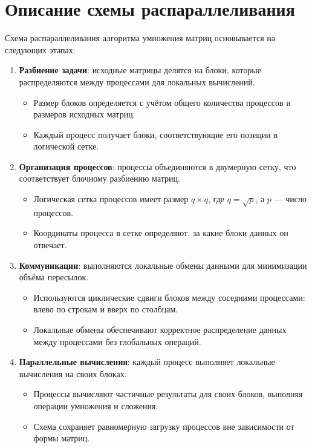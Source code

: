 \documentclass[12pt]{article}
\begin{document}
\section{Описание схемы распараллеливания}
\hspace*{1.25em}Схема распараллеливания алгоритма умножения матриц основывается на следующих этапах:
\begin{enumerate}
    \item \textbf{Разбиение задачи}: исходные матрицы делятся на блоки, которые распределяются между процессами для локальных вычислений.
    \begin{itemize}
        \item Размер блоков определяется с учётом общего количества процессов и размеров исходных матриц.
        \item Каждый процесс получает блоки, соответствующие его позиции в логической сетке.
    \end{itemize}
    
    \item \textbf{Организация процессов}: процессы объединяются в двумерную сетку, что соответствует блочному разбиению матриц.
    \begin{itemize}
        \item Логическая сетка процессов имеет размер $q \times q$, где $q = \sqrt{p}$, а $p$ — число процессов.
        \item Координаты процесса в сетке определяют, за какие блоки данных он отвечает.
    \end{itemize}
    
    \item \textbf{Коммуникации}: выполняются локальные обмены данными для минимизации объёма пересылок.
    \begin{itemize}
        \item Используются циклические сдвиги блоков между соседними процессами: влево по строкам и вверх по столбцам.
        \item Локальные обмены обеспечивают корректное распределение данных между процессами без глобальных операций.
    \end{itemize}
    
    \item \textbf{Параллельные вычисления}: каждый процесс выполняет локальные вычисления на своих блоках.
    \begin{itemize}
        \item Процессы вычисляют частичные результаты для своих блоков, выполняя операции умножения и сложения.
        \item Схема сохраняет равномерную загрузку процессов вне зависимости от формы матриц.
    \end{itemize}
    

\end{enumerate}
\end{document}
